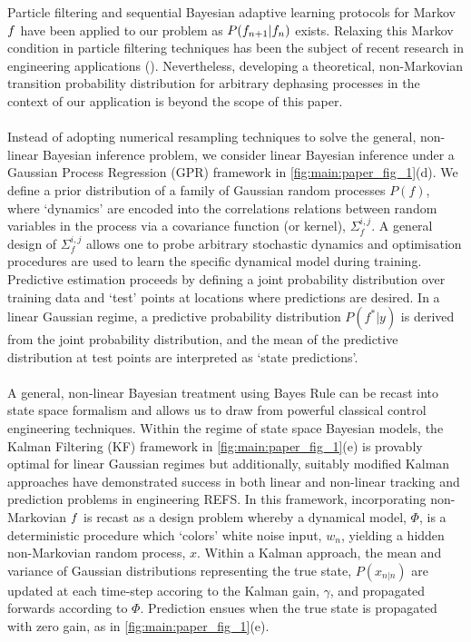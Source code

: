 Particle filtering and sequential Bayesian adaptive learning protocols for Markov $f$ have been applied to our problem as $ P(f_{n+1} | f_n)$ exists. Relaxing this Markov condition in particle filtering techniques has been the subject of recent research in engineering applications (\cite{wiebe2015bayesian, jacob2016}). Nevertheless, developing a theoretical, non-Markovian transition probability distribution for arbitrary dephasing processes in the context  of our application is beyond the scope of this paper. 
\\
\\
Instead of adopting numerical resampling techniques to solve the general, non-linear Bayesian inference problem, we consider linear Bayesian inference under a Gaussian Process Regression (GPR) framework in \cref{fig:main:paper_fig_1}(d). We define a prior distribution of a family of Gaussian random processes $P(f)$, where `dynamics' are encoded into the correlations relations between random variables in the process via a covariance function (or kernel), $\Sigma_f^{i, j} $.  A general design of $\Sigma_f^{i, j}$ allows one to probe arbitrary stochastic dynamics and optimisation procedures are used to learn the specific dynamical model during training.  Predictive estimation proceeds by defining a joint probability distribution over training data and `test' points at locations where predictions are desired. In a linear Gaussian regime, a predictive probability distribution $P(f^*|y)$ is derived from the joint probability distribution, and the mean of the predictive distribution at test points are interpreted as `state predictions'.
\\
\\
A general, non-linear Bayesian treatment using Bayes Rule can be recast into state space formalism and allows us to draw from powerful classical control engineering techniques. Within the regime of state space Bayesian models, the Kalman Filtering (KF) framework in \cref{fig:main:paper_fig_1}(e) is provably optimal for linear Gaussian regimes but additionally, suitably modified Kalman approaches have demonstrated success in both linear and non-linear tracking and prediction problems in engineering REFS. In this framework, incorporating non-Markovian $f$ is recast as a design problem whereby a dynamical model, $\Phi$, is a deterministic procedure which `colors' white noise input, $w_n$, yielding a hidden non-Markovian random process, $x$.  Within a Kalman approach, the mean and variance of Gaussian distributions representing the true state, $P(x_{n|n})$ are updated at each time-step accoring to the Kalman gain, $\gamma$, and propagated forwards according to $\Phi$. Prediction ensues when the true state is propagated with zero gain, as in \cref{fig:main:paper_fig_1}(e).  
